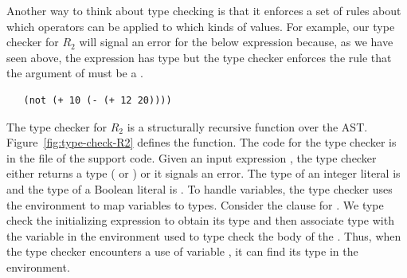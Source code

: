 \documentclass[11pt]{book}
\begin{document}
Another way to think about type checking is that it enforces a set of
rules about which operators can be applied to which kinds of
values. For example, our type checker for $R_2$ will signal an error
for the below expression because, as we have seen above, the
expression  has type  but the type
checker enforces the rule that the argument of  must be a
.
\begin{lstlisting}
   (not (+ 10 (- (+ 12 20))))
\end{lstlisting}

The type checker for $R_2$ is a structurally recursive function over
the AST. Figure~\ref{fig:type-check-R2} defines the
 function. The code for the type checker is in
the file  of the support code.
%
Given an input expression , the type checker either returns a
type ( or ) or it signals an error.  The
type of an integer literal is  and the type of a Boolean
literal is .  To handle variables, the type checker uses
the environment  to map variables to types. Consider the
clause for .  We type check the initializing expression to
obtain its type  and then associate type  with the
variable  in the environment used to type check the body of
the . Thus, when the type checker encounters a use of
variable , it can find its type in the environment.
\end{document}
